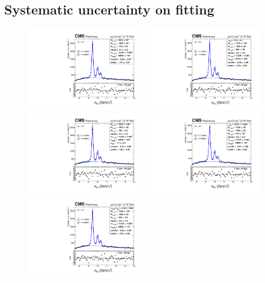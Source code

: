 \subsection{Systematic uncertainty on fitting}
\label{sec:figs_syst}
\begin{figure}
\begin{center}
  \includegraphics[width=0.45\textwidth]{Chapters/aYield/pp/pt_3p5_4/Rap/Rap_0_2p4/pp2p76tev_Rap_0_2p4_fsr1.pdf}
  \includegraphics[width=0.45\textwidth]{Chapters/aYield/pp/pt_3p5_4/Rap/Rap_0_2p4/pp2p76tev_Rap_0_2p4_fsr2.pdf}
  \includegraphics[width=0.45\textwidth]{Chapters/aYield/pp/pt_3p5_4/Rap/Rap_0_2p4/pp2p76tev_Rap_0_2p4_fsr3.pdf}
  \includegraphics[width=0.45\textwidth]{Chapters/aYield/pp/pt_3p5_4/Rap/Rap_0_2p4/pp2p76tev_Rap_0_2p4_fsr4.pdf}
  \includegraphics[width=0.45\textwidth]{Chapters/aYield/pp/pt_3p5_4/Rap/Rap_0_2p4/pp2p76tev_Rap_0_2p4_fsr5.pdf}

\end{center}
\end{figure}
